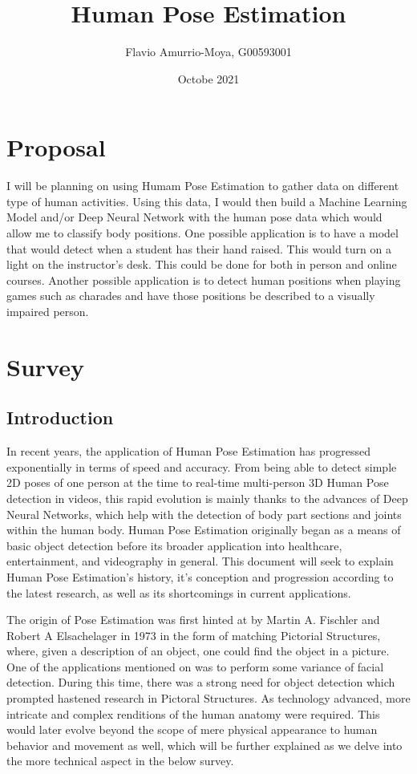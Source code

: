 \documentclass[12pt]{extarticle}
\title{Human Pose Estimation}
\author{Flavio Amurrio-Moya, G00593001}
\date{Octobe 2021}
\begin{document}
\maketitle

\section{Proposal}
I will be planning on using Humam Pose Estimation to gather data on different type
of human activities. Using this data, I would then build a Machine Learning
Model and/or Deep Neural Network with the human pose data which would allow me
to classify body positions. One possible application is to have a model that
would detect when a student has their hand raised. This would turn on a light on the instructor's desk. This could be done for both in person and
online courses. Another possible application is to detect human positions when
playing games such as charades and have those positions be described to a visually
impaired person.

\section{Survey}

\subsection{Introduction}
In recent years, the application of Human Pose Estimation has progressed
exponentially in terms of speed and accuracy. From being able to detect simple
2D poses of one person at the time to real-time multi-person 3D Human Pose
detection in videos, this rapid evolution is mainly thanks to the advances of
Deep Neural Networks, which help with the detection of body part sections and
joints within the human body. Human Pose Estimation originally began as a means
of basic object detection before its broader application into healthcare,
entertainment, and videography in general. This document will seek to explain
Human Pose Estimation's history, it's conception and progression according to
the latest research, as well as its shortcomings in current applications.

The origin of Pose Estimation was first hinted at by Martin A. Fischler and
Robert A Elsachelager \cite{FischlerM.A1973TRaM} in 1973 in the form of matching
Pictorial Structures, where, given a description of an object, one could find
the object in a picture. One of the applications mentioned on
\cite{FischlerM.A1973TRaM} was to perform some variance of facial detection.
During this time, there was a strong need for object detection which prompted
hastened research in Pictoral Structures. As technology advanced, more intricate
and complex renditions of the human anatomy were required. This would later
evolve beyond the scope of mere physical appearance to human behavior and movement as
well, which will be further explained as we delve into the more technical aspect in the below
survey.
\end{document}
